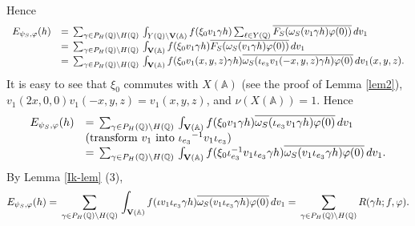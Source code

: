 \documentclass[11pt]{amsart}
\numberwithin{equation}{section}
\theoremstyle{definition}
\begin{document}
Hence 
$$
\begin{array}{ll}
E_{\psi_S,\varphi}(h)&={\displaystyle}\sum_{\gamma\in P_H({\mathbb{Q}}){\backslash} H({\mathbb{Q}})}{\displaystyle}\int_{Y({\mathbb{Q}})\backslash \bold V({\mathbb{A}})}f(\xi_0 v_1\gamma h)
\sum_{\ell\in Y({\mathbb{Q}})}\overline{F_S(\omega_S(v_1\gamma h)\varphi(0))}\, dv_1 \\
&={\displaystyle}\sum_{\gamma\in P_H({\mathbb{Q}}){\backslash} H({\mathbb{Q}})}{\displaystyle}\int_{ \bold V({\mathbb{A}})}f(\xi_0 v_1\gamma h)
\overline{F_S(\omega_S(v_1\gamma h)\varphi(0))}\, dv_1 \\
&={\displaystyle}\sum_{\gamma\in P_H({\mathbb{Q}}){\backslash} H({\mathbb{Q}})}{\displaystyle}\int_{ \bold V({\mathbb{A}})}f(\xi_0 v_1(x,y,z)\gamma h)
\overline{\omega_S(\iota_{e_3}v_1(-x,y,z)\gamma h)\varphi(0)}\, dv_1(x,y,z). 
\end{array}
$$
It is easy to see that $\xi_0$ commutes with $X({\mathbb{A}})$ (see the proof of Lemma \ref{lem2}), $v_1(2x,0,0)v_1(-x,y,z)=v_1(x,y,z)$, and $\nu(X({\mathbb{A}}))=1$. Hence 
$$
\begin{array}{ll}
E_{\psi_S,\varphi}(h)&={\displaystyle}\sum_{\gamma\in P_H({\mathbb{Q}}){\backslash} H({\mathbb{Q}})}{\displaystyle}\int_{ \bold V({\mathbb{A}})}f(\xi_0 v_1\gamma h)
\overline{\omega_S(\iota_{e_3}v_1\gamma h)\varphi(0)}\, dv_1 \\
&({\rm transform }\ v_1\ {\rm into}\ {\iota_{e_3}}^{-1} v_1 \iota_{e_3})\\
&={\displaystyle}\sum_{\gamma\in P_H({\mathbb{Q}}){\backslash} H({\mathbb{Q}})}{\displaystyle}\int_{ \bold V({\mathbb{A}})}f(\xi_0 \iota^{-1}_{e_3} v_1 \iota_{e_3}\gamma h)
\overline{\omega_S(v_1\iota_{e_3}\gamma h)\varphi(0)}\, dv_1.
\end{array}
$$
By Lemma \ref{Ik-lem} (3),
$$
E_{\psi_S,\varphi}(h)={\displaystyle}\sum_{\gamma\in P_H({\mathbb{Q}}){\backslash} H({\mathbb{Q}})}{\displaystyle}\int_{ \bold V({\mathbb{A}})}f(\iota v_1 \iota_{e_3}\gamma h)
\overline{\omega_S(v_1\iota_{e_3}\gamma h)\varphi(0)}\, dv_1
={\displaystyle}\sum_{\gamma\in P_H({\mathbb{Q}}){\backslash} H({\mathbb{Q}})}R(\gamma h;f,\varphi). 
$$
\end{document}

